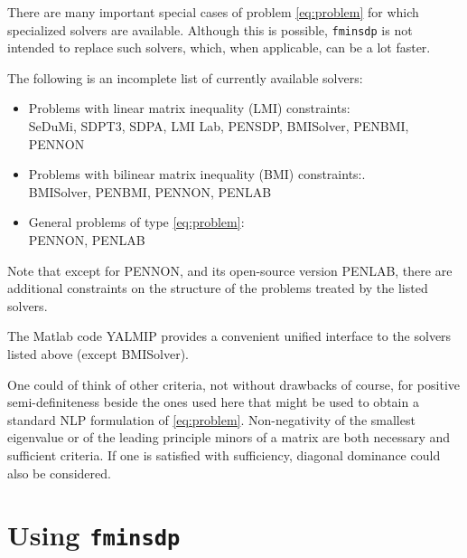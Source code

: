 \documentclass{article}
\begin{document}
There are many important special cases of problem \eqref{eq:problem} for which specialized solvers 
are available. Although this is possible, \texttt{fminsdp} is not intended to replace such solvers, which, 
when applicable, can be a lot faster.

The following is an incomplete list of currently available solvers:
\begin{itemize}
\item Problems with linear matrix inequality (LMI) constraints:\\
\hskip2mm SeDuMi, SDPT3, SDPA, LMI Lab, PENSDP, BMISolver, PENBMI, PENNON
\item Problems with bilinear matrix inequality (BMI) constraints:.\\
\hskip2mm BMISolver, PENBMI, PENNON, PENLAB
\item General problems of type \eqref{eq:problem}:\\
\hskip2mm PENNON, PENLAB
\end{itemize}
Note that except for PENNON, and its open-source version PENLAB, there are additional constraints on the structure of the problems treated by the listed solvers.

The Matlab code YALMIP \cite{Yalmip:2004} provides a convenient unified interface to the solvers listed above (except BMISolver).

One could of think of other criteria, not without drawbacks of course, for positive semi-definiteness beside the ones used here that might be used to obtain a standard NLP formulation of \eqref{eq:problem}. Non-negativity of the smallest eigenvalue or of the leading principle minors of a matrix are both necessary and sufficient criteria. If one is satisfied with sufficiency, diagonal dominance could also be considered.





\section{Using \texttt{fminsdp}}
\label{sec:using}
\end{document}
